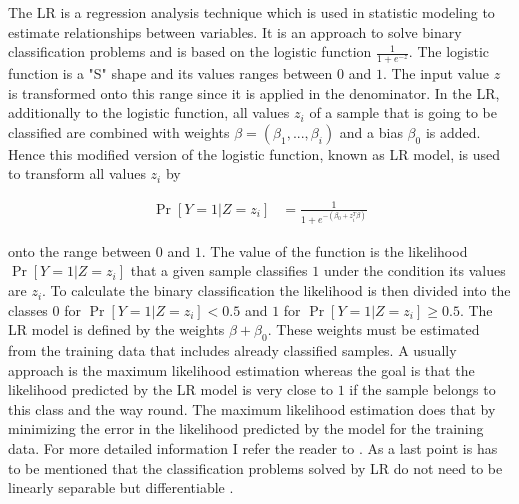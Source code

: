 The \acf{LR} is a regression analysis technique which is used in statistic modeling to estimate relationships between variables. %
It is an approach to solve binary classification problems and is based on the logistic function $\frac{1}{1 + e^{-z}}$.
The logistic function is a "S" shape and its values ranges between $0$ and $1$.
The input value $z$ is transformed onto this range since it is applied in the denominator.
In the \ac{LR}, additionally to the logistic function, all values $z_i$ of a sample that is going to be classified are combined with weights $\beta =(\beta_1, ..., \beta_i)$ and a bias $\beta_0$ is added.
Hence this modified version of the logistic function, known as \ac{LR} model, is used to transform all values $z_i$ by 

\begin{align*}
\Pr[Y = 1 | Z = z_i] &= \frac{1}{1 + e^{-(\beta_0 + z^T_i \beta)}}
\end{align*}

onto the range between $0$ and $1$.
The value of the function is the likelihood $\Pr[Y = 1 | Z = z_i]$ that a given sample classifies $1$ under the condition its values are $z_i$.
To calculate the binary classification the likelihood is then divided into the classes $0$ for $\Pr[Y = 1 | Z = z_i] < 0.5$ and $1$ for $\Pr[Y = 1 | Z = z_i] \ge 0.5$.
The \ac{LR} model is defined by the weights $\beta + \beta_0$. %
These weights must be estimated from the training data that includes already classified samples.
A usually approach is the maximum likelihood estimation whereas the goal is that the likelihood predicted by the \ac{LR} model is very close to $1$ if the sample belongs to this class and the way round.
The maximum likelihood estimation does that by minimizing the error in the likelihood predicted by the model for the training data. %
For more detailed information I refer the reader to \cite{2017MaximumEstimation}.
As a last point is has to be mentioned that the classification problems solved by \ac{LR} do not need to be linearly separable but differentiable \cite{Ruhrmair2010ModelingFunctions}.

